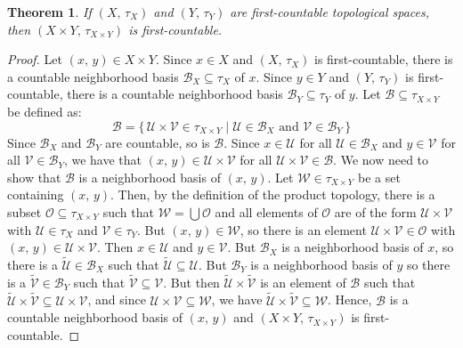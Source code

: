 \documentclass{article}
\theoremstyle{plain}
\newtheorem{theorem}{Theorem}[section]
\theoremstyle{normal}
\begin{document}
        \begin{theorem}
            If $(X,\,\tau_{X})$ and $(Y,\,\tau_{Y})$ are first-countable
            topological spaces, then $(X\times{Y},\,\tau_{X\times{Y}})$ is
            first-countable.
        \end{theorem}
        \begin{proof}
            Let $(x,\,y)\in{X}\times{Y}$. Since $x\in{X}$ and $(X,\,\tau_{X})$
            is first-countable, there is a countable neighborhood basis
            $\mathcal{B}_{X}\subseteq\tau_{X}$ of $x$. Since $y\in{Y}$ and
            $(Y,\,\tau_{Y})$ is first-countable, there is a countable
            neighborhood basis $\mathcal{B}_{Y}\subseteq\tau_{Y}$ of $y$.
            Let $\mathcal{B}\subseteq\tau_{X\times{Y}}$ be defined as:
            \begin{equation}
                \mathcal{B}=
                \{\,\mathcal{U}\times\mathcal{V}\in\tau_{X\times{Y}}\;|\;
                \mathcal{U}\in\mathcal{B}_{X}\textrm{ and }
                \mathcal{V}\in\mathcal{B}_{Y}\,\}
            \end{equation}
            Since $\mathcal{B}_{X}$ and $\mathcal{B}_{Y}$ are countable, so
            is $\mathcal{B}$. Since $x\in\mathcal{U}$ for all
            $\mathcal{U}\in\mathcal{B}_{X}$ and $y\in\mathcal{V}$ for all
            $\mathcal{V}\in\mathcal{B}_{Y}$, we have that
            $(x,\,y)\in\mathcal{U}\times\mathcal{V}$ for all
            $\mathcal{U}\times\mathcal{V}\in\mathcal{B}$. We now need to show
            that $\mathcal{B}$ is a neighborhood basis of $(x,\,y)$. Let
            $\mathcal{W}\in\tau_{X\times{Y}}$ be a set containing $(x,\,y)$.
            Then, by the definition of the product topology, there is a subset
            $\mathcal{O}\subseteq\tau_{X\times{Y}}$ such that
            $\mathcal{W}=\bigcup\mathcal{O}$ and all elements of
            $\mathcal{O}$ are of the form
            $\mathcal{U}\times\mathcal{V}$ with $\mathcal{U}\in\tau_{X}$ and
            $\mathcal{V}\in\tau_{Y}$. But $(x,\,y)\in\mathcal{W}$, so there
            is an element $\mathcal{U}\times\mathcal{V}\in\mathcal{O}$
            with $(x,\,y)\in\mathcal{U}\times\mathcal{V}$. Then
            $x\in\mathcal{U}$ and $y\in\mathcal{V}$. But
            $\mathcal{B}_{X}$ is a neighborhood basis of $x$, so there is a
            $\tilde{\mathcal{U}}\in\mathcal{B}_{X}$ such that
            $\tilde{\mathcal{U}}\subseteq\mathcal{U}$. But $\mathcal{B}_{Y}$
            is a neighborhood basis of $y$ so there is a
            $\tilde{\mathcal{V}}\in\mathcal{B}_{Y}$ such that
            $\tilde{\mathcal{V}}\subseteq\mathcal{V}$. But then
            $\tilde{\mathcal{U}}\times\tilde{\mathcal{V}}$ is an element of
            $\mathcal{B}$ such that
            $\tilde{\mathcal{U}}\times\tilde{\mathcal{V}}\subseteq\mathcal{U}\times\mathcal{V}$,
            and since $\mathcal{U}\times\mathcal{V}\subseteq\mathcal{W}$, we
            have $\tilde{\mathcal{U}}\times\tilde{\mathcal{V}}\subseteq\mathcal{W}$.
            Hence, $\mathcal{B}$ is a countable neighborhood basis of
            $(x,\,y)$ and $(X\times{Y},\,\tau_{X\times{Y}})$ is
            first-countable.
        \end{proof}
\end{document}

